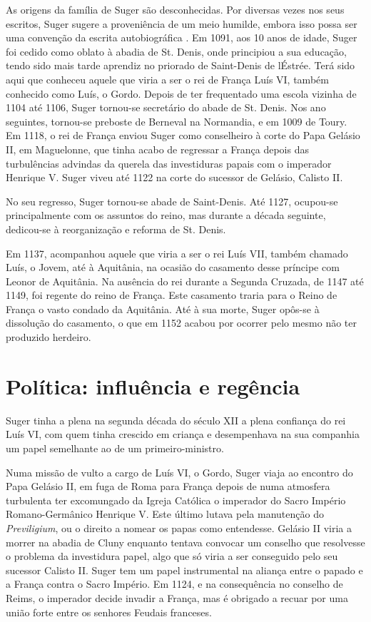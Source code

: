 \documentclass{article}
\begin{document}
As origens da família de Suger são desconhecidas. Por diversas vezes
nos seus escritos, Suger sugere a proveniência de um meio humilde,
embora isso possa ser uma convenção da escrita autobiográfica
\cite{wikipedia-suger}. Em 1091, aos 10 anos de idade, Suger foi
cedido como oblato à abadia de St. Denis, onde principiou a sua
educação, tendo sido mais tarde aprendiz no priorado de Saint-Denis de
lÉstrée. Terá sido aqui que conheceu aquele que viria a ser o rei de
França Luís VI, também conhecido como Luís, o Gordo. Depois de ter
frequentado uma escola vizinha de 1104 até 1106, Suger tornou-se
secretário do abade de St. Denis. Nos ano seguintes, tornou-se
preboste de Berneval na Normandia, e em 1009 de Toury. Em 1118, o rei
de França enviou Suger como conselheiro à corte do Papa Gelásio II, em
Maguelonne, que tinha acabo de regressar a França depois das
turbulências advindas da querela das investiduras papais com o
imperador Henrique V. Suger viveu até 1122 na corte do sucessor de
Gelásio, Calisto II.

No seu regresso, Suger tornou-se abade de Saint-Denis. Até 1127,
ocupou-se principalmente com os assuntos do reino, mas durante a
década seguinte, dedicou-se à reorganização e reforma de St. Denis.

Em 1137, acompanhou aquele que viria a ser o rei Luís VII, também
chamado Luís, o Jovem, até à Aquitânia, na ocasião do casamento desse
príncipe com Leonor de Aquitânia. Na ausência do rei durante a Segunda
Cruzada, de 1147 até 1149, foi regente do reino de França. Este
casamento traria para o Reino de França o vasto condado da
Aquitânia. Até à sua morte, Suger opôs-se à dissolução do casamento, o
que em 1152 acabou por ocorrer pelo mesmo não ter produzido herdeiro.

\section{Política: influência e regência}

Suger tinha a plena na segunda década do século XII a plena confiança
do rei Luís VI, com quem tinha crescido em criança e desempenhava na
sua companhia um papel semelhante ao de um primeiro-ministro.

Numa missão de vulto a cargo de Luís VI, o Gordo, Suger viaja ao
encontro do Papa Gelásio II, em fuga de Roma para França depois de
numa atmosfera turbulenta ter excomungado da Igreja Católica o
imperador do Sacro Império Romano-Germânico Henrique V. Este último
lutava pela manutenção do \emph{Previligium}, ou o direito a nomear os
papas como entendesse. Gelásio II viria a morrer na abadia de Cluny
enquanto tentava convocar um conselho que resolvesse o problema da
investidura papel, algo que só viria a ser conseguido pelo seu
sucessor Calisto II.  Suger tem um papel instrumental na aliança entre
o papado e a França contra o Sacro Império. Em 1124, e na consequência
no conselho de Reims, o imperador decide invadir a França, mas é
obrigado a recuar por uma união forte entre os senhores Feudais
franceses.
\end{document}
